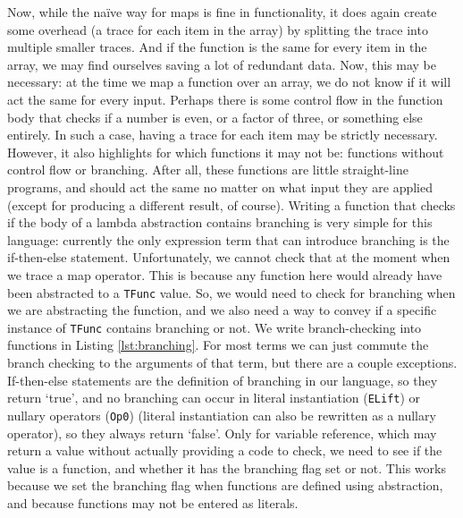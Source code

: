        Now, while the naïve way for maps is fine in functionality, it does again create some overhead (a trace for each item in the array) by splitting the trace into multiple smaller traces.
        And if the function is the same for every item in the array, we may find ourselves saving a lot of redundant data.
        Now, this may be necessary: at the time we map a function over an array, we do not know if it will act the same for every input.
        Perhaps there is some control flow in the function body that checks if a number is even, or a factor of three, or something else entirely.
        In such a case, having a trace for each item may be strictly necessary.
        However, it also highlights for which functions it may not be: functions without control flow or branching.
        After all, these functions are little straight-line programs, and should act the same no matter on what input they are applied (except for producing a different result, of course).
        Writing a function that checks if the body of a lambda abstraction contains branching is very simple for this language: currently the only expression term that can introduce branching is the if-then-else statement.
        Unfortunately, we cannot check that at the moment when we trace a map operator.
        This is because any function here would already have been abstracted to a \texttt{TFunc} value.
        So, we would need to check for branching when we are abstracting the function, and we also need a way to convey if a specific instance of \texttt{TFunc} contains branching or not.
        We write branch-checking into functions in Listing \ref{lst:branching}.
        For most terms we can just commute the branch checking to the arguments of that term, but there are a couple exceptions.
        If-then-else statements are the definition of branching in our language, so they return `true', and no branching can occur in literal instantiation (\texttt{ELift}) or nullary operators (\texttt{Op0}) (literal instantiation can also be rewritten as a nullary operator), so they always return `false'.
        Only for variable reference, which may return a value without actually providing a code to check, we need to see if the value is a function, and whether it has the branching flag set or not.
        This works because we set the branching flag when functions are defined using abstraction, and because functions may not be entered as literals.

